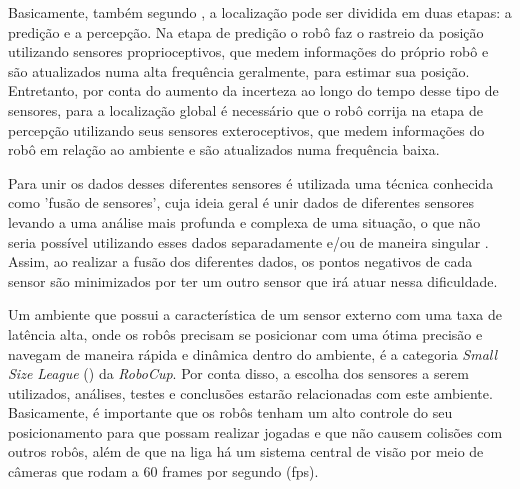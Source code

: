 \documentclass[acronym, symbols, table]{fei}
\begin{document}
	
	Basicamente, também segundo \textcite{PANIGRAHI20226019}, a localização pode ser dividida em duas etapas: a predição e a percepção. Na etapa de predição o robô faz o rastreio da posição utilizando sensores proprioceptivos, que medem informações do próprio robô e são atualizados numa alta frequência geralmente, para estimar sua posição. Entretanto, por conta do aumento da incerteza ao longo do tempo desse tipo de sensores, para a localização global é necessário que o robô corrija na etapa de percepção utilizando seus sensores exteroceptivos, que medem informações do robô em relação ao ambiente e são atualizados numa frequência baixa.
	
	Para unir os dados desses diferentes sensores é utilizada uma técnica conhecida como 'fusão de sensores', cuja ideia geral é unir dados de diferentes sensores levando a uma análise mais profunda e complexa de uma situação, o que não seria possível utilizando esses dados separadamente e/ou de maneira singular \cite{s16101569}. Assim, ao realizar a fusão dos diferentes dados, os pontos negativos de cada sensor são minimizados por ter um outro sensor que irá atuar nessa dificuldade.
	
	Um ambiente que possui a característica de um sensor externo com uma taxa de latência alta, onde os robôs precisam se posicionar com uma ótima precisão e navegam de maneira rápida e dinâmica dentro do ambiente, é a categoria \textit{Small Size League} () da \textit{RoboCup}. Por conta disso, a escolha dos sensores a serem utilizados, análises, testes e conclusões estarão relacionadas com este ambiente. Basicamente, é importante que os robôs tenham um alto controle do seu posicionamento para que possam realizar jogadas e que não causem colisões com outros robôs, além de que na liga há um sistema central de visão por meio de câmeras que rodam a 60 frames por segundo (fps).
	
\end{document}
